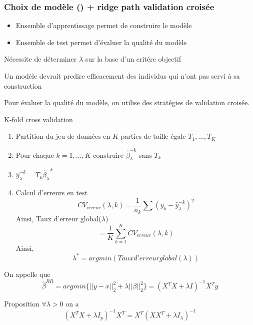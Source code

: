 \documentclass{article}
\begin{document}
\subsubsection{Choix de mod\`ele (\lambda) + ridge path validation crois\'ee}
\begin{itemize}
        \item Ensemble d'apprentissage permet de construire le mod\`ele
        \item Ensemble de test permet d'\'evaluer la qualit\'e du mod\`ele 
\end{itemize}

N\'ecessite de d\'eterminer $\lambda$ sur la base d'un crit\'ere objectif

Un mod\`ele devrait predire efficacement des individus qui n'ont pas servi \`a sa construction

Pour \'evaluer la qualit\'e du mod\`ele, on utilise des strat\'egies de validation crois\'ee.

K-fold cross validation
\begin{enumerate}
\item Partition du jeu de donn\'ees en $K$ parties de taille \'egale $T_1,\ldots,T_K$
\item Pour chaque $k=1,\ldots,K$ construire $\hat{\beta}_\lambda^{-k}$ sans $T_k$
\item $\hat{y}_\lambda^{-k}=T_k\hat{\beta}_\lambda^{-k}$
\item Calcul d'erreurs en test
\begin{equation}
CV_{erreur}(\lambda,k)=\frac{1}{n_k}\sum(y_k-\hat{y}_\lambda^{-k})^2
\end{equation}
Ainsi, Taux d'erreur global($\lambda$)
\begin{equation}
=\frac{1}{K}\sum_{k=1}^KCV_{erreur}(\lambda,k)
\end{equation}
Ainsi,
\begin{equation}
\lambda^*=argmin(Taux d'erreur global(\lambda))
\end{equation}
\end{enumerate}

On appelle que 
\begin{equation}
\hat{\beta}^{RR}=argmin\{||y-x||^2_2+\lambda||\beta||_2^2\}=(X^TX+\lambda I)^{-1}X^Ty
\end{equation}

Proposition
$\forall \lambda>0$ on a 
\begin{equation}
(X^TX+\lambda I_p)^{-1}X^T=X^T(XX^T+\lambda I_\lambda)^{-1}
\end{equation}
\end{document}
